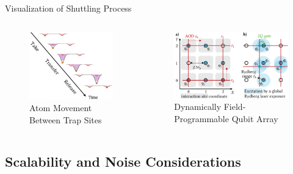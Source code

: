 \begin{frame}{Visualization of Shuttling Process}
    \begin{columns}
        \begin{column}{.48\textwidth}
            \begin{figure}
                \includegraphics[width=.8\textwidth]{images/rearrange.png}
                \caption{Atom Movement Between Trap Sites}
            \end{figure}
        \end{column}
        \begin{column}{.48\textwidth}
            \begin{figure}
                \includegraphics[width=.8\textwidth]{images/dpqa.png}
                \caption{Dynamically Field-Programmable Qubit Array}
            \end{figure}
        \end{column}
    \end{columns}
\end{frame}

\subsection{Scalability and Noise Considerations}

